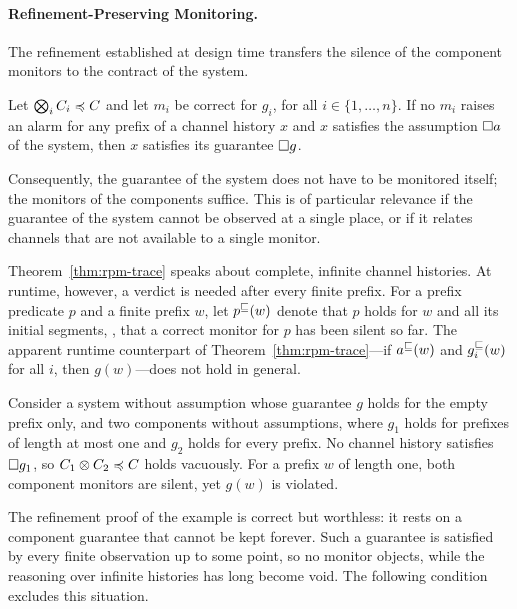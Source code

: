 \paragraph{Refinement-Preserving Monitoring.}
The refinement established at design time transfers the silence of the component monitors to the contract of the system.

\begin{theorem}\label{thm:rpm-trace}
  Let $\bigotimes_i C_i \preccurlyeq C$ and let $m_i$ be correct for $g_i$, for all $i \in \{1, \dots, n\}$. If no $m_i$ raises an alarm for any prefix of a channel history $x$ and $x$ satisfies the assumption $\Box a$ of the system, then $x$ satisfies its guarantee $\Box g$.
\end{theorem}

\noindent
Consequently, the guarantee of the system does not have to be monitored itself; the monitors of the components suffice. This is of particular relevance if the guarantee of the system cannot be observed at a single place, or if it relates channels that are not available to a single monitor.

Theorem~\ref{thm:rpm-trace} speaks about complete, infinite channel histories. At runtime, however, a verdict is needed after every finite prefix. For a prefix predicate $p$ and a finite prefix $w$, let $p^{\sqsubseteq}(w)$ denote that $p$ holds for $w$ and all its initial segments, \ie, that a correct monitor for $p$ has been silent so far. The apparent runtime counterpart of Theorem~\ref{thm:rpm-trace}---if $a^{\sqsubseteq}(w)$ and $g_i^{\sqsubseteq}(w)$ for all $i$, then $g(w)$---does not hold in general.

\begin{example}\label{ex:counterexample}
  Consider a system without assumption whose guarantee $g$ holds for the empty prefix only, and two components without assumptions, where $g_1$ holds for prefixes of length at most one and $g_2$ holds for every prefix. No channel history satisfies $\Box g_1$, so $C_1 \otimes C_2 \preccurlyeq C$ holds vacuously. For a prefix $w$ of length one, both component monitors are silent, yet $g(w)$ is violated.
\end{example}

\noindent
The refinement proof of the example is correct but worthless: it rests on a component guarantee that cannot be kept forever. Such a guarantee is satisfied by every finite observation up to some point, so no monitor objects, while the reasoning over infinite histories has long become void. The following condition excludes this situation.

